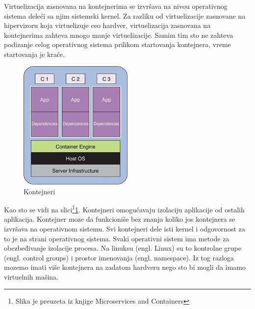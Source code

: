 \documentclass[12pt,oneside]{memoir}
\begin{document}
Virtuelizacija zasnovana na kontejnerima se izvršava na nivou operativnog sistema deleći sa njim sistemski kernel. Za razliku od virtuelizacije zasnovane na hipervizoru koja virtuelizuje ceo hardver, virtuelizacija zasnovana na kontejnerima zahteva mnogo manje virtuelizacije. Samim tim sto ne zahteva podizanje celog operativnog sistema prilikom startovanja kontejnera, vreme startovanja je kraće\cite{gswc}. 
 
\begin{figure}[!ht]
  \centering
  \includegraphics[width=0.5\textwidth]{Slika 4.jpg}
  \caption{Kontejneri}
  \label{fig:kontejneri}
\end{figure}
 
Kao sto se vidi na slici\footnote{Slika je preuzeta iz knjige Microservices and Containers}\ref{fig:kontejneri}. Kontejneri omogućavaju izolaciju aplikacije od ostalih aplikacija. Kontejner moze da funkcioniše bez znanja koliko jos kontejnera se izvršava na operativnom sistemu. Svi kontejneri dele isti kernel i odgovornost za to je na strani operativnog sistema. Svaki operativni sistem ima metode za obezbeđivanje izolacije procesa. Na linuksu (engl. Linux) su to kontrolne grupe (engl. control groups) i prostor imenovanja (engl. namespace). Iz tog razloga mozemo imati više kontejnera na zadatom hardveru nego sto bi mogli da imamo virtuelnih mašina\cite{mac}. 
\end{document}

